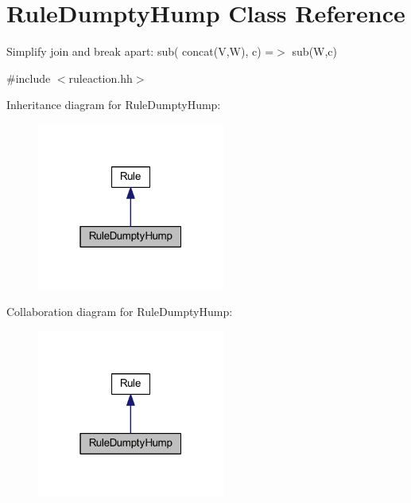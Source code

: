 \hypertarget{class_rule_dumpty_hump}{}\section{Rule\+Dumpty\+Hump Class Reference}
\label{class_rule_dumpty_hump}


Simplify join and break apart\+: {\ttfamily sub( concat(\+V,\+W), c) =$>$ sub(\+W,c)}  




{\ttfamily \#include $<$ruleaction.\+hh$>$}



Inheritance diagram for Rule\+Dumpty\+Hump\+:
\nopagebreak
\begin{figure}[H]
\begin{center}
\leavevmode
\includegraphics[width=175pt]{class_rule_dumpty_hump__inherit__graph}
\end{center}
\end{figure}


Collaboration diagram for Rule\+Dumpty\+Hump\+:
\nopagebreak
\begin{figure}[H]
\begin{center}
\leavevmode
\includegraphics[width=175pt]{class_rule_dumpty_hump__coll__graph}
\end{center}
\end{figure}
